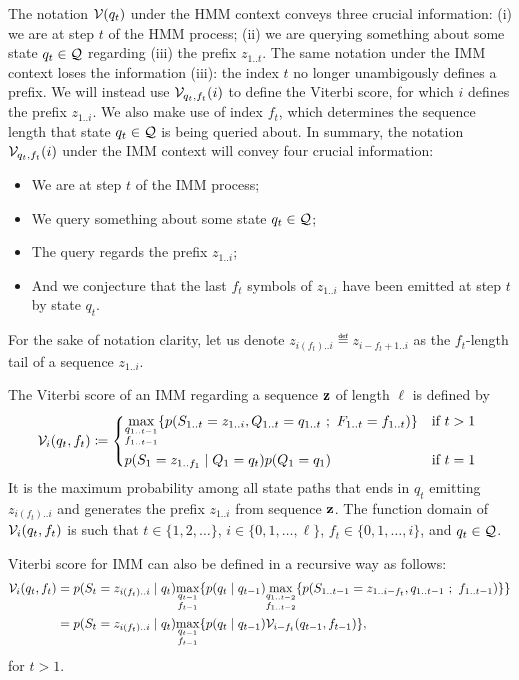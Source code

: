 The notation $\mathcal{V}(q_t)$ under the HMM context conveys three crucial information: (i) we are at
step $t$ of the HMM process; (ii) we are querying something about some state $q_t \in \mathcal{Q}$
regarding (iii) the prefix $z_{1..t}$. The same notation under the IMM context loses the information
(iii): the index $t$ no longer unambigously defines a prefix. We will instead use
$\mathcal{V}_{q_t,f_t}(i)$ to define the Viterbi score, for which $i$ defines the prefix $z_{1..i}$. We
also make use of index $f_t$, which determines the sequence length that state $q_t \in \mathcal{Q}$ is
being queried about.
In summary, the notation $\mathcal{V}_{q_t,f_t}(i)$ under the IMM context will convey four crucial
information:
\begin{itemize}
  \item We are at step $t$ of the IMM process;
  \item We query something about some state $q_t \in \mathcal{Q}$;
  \item The query regards the prefix $z_{1..i}$;
  \item And we conjecture that the last $f_t$ symbols of $z_{1..i}$ have been emitted at step $t$ by
    state $q_t$.
\end{itemize}
For the sake of notation clarity, let us denote $z_{i(f_t)..i} \eqdef z_{i-f_t+1..i}$ as the
$f_t$-length tail of a sequence $z_{1..i}$.

The Viterbi score of an IMM regarding a sequence $\mathbf{z}$ of length $\ell$ is defined by
\begin{equation*}
  \viterbi_{i}(q_t,f_t) \eqdef
  \begin{dcases*}
    \umax{\substack{q_{1..t-1}\\f_{1..t-1}}}
    \{
      p(S_{1..t}=z_{1..i}, Q_{1..t}=q_{1..t} ~;~ F_{1..t}=f_{1..t})
    \}                                                                  & if $t>1$\\
    p(S_1=z_{1..f_1} \gv Q_1=q_t) p(Q_1=q_1)                            & if $t=1$
  \end{dcases*}
\end{equation*}
It is the maximum probability among all state paths that ends in
$q_t$ emitting $z_{i(f_t)..i}$ and generates the prefix $z_{1..i}$ from sequence $\mathbf{z}$.
The function domain of $\mathcal{V}_{i}(q_t,f_t)$ is such that $t \in \{1, 2, \dots\}$, $i \in \{0, 1,
\dots, \ell\}$, $f_t \in \{0, 1, \dots, i\}$, and $q_t \in \mathcal{Q}$.

Viterbi score for IMM can also be defined in a recursive way as follows:
\begin{equation*}
  \begin{split}
    \mathcal{V}_{i}(q_t,f_t)
    &= p(S_t=z_{i(f_t)..i} \;|\; q_t)
      \underset{\substack{q_{t-1}\\f_{t-1}}}{\max}
      \{
        p(q_t \;|\; q_{t-1})
        \underset{\substack{q_{1..t-2}\\f_{1..t-2}}}{\max}
        \{
          p(S_{1..t-1}=z_{1..i-f_t}, q_{1..t-1} ~;~ f_{1..t-1})
        \}
      \}\\
    &= p(S_t=z_{i(f_t)..i} \;|\; q_t)
      \underset{\substack{q_{t-1}\\f_{t-1}}}{\max}
      \{
        p(q_t \;|\; q_{t-1}) \mathcal{V}_{i-f_t}(q_{t-1},f_{t-1})
      \},
  \end{split}
\end{equation*}
for $t>1$.

